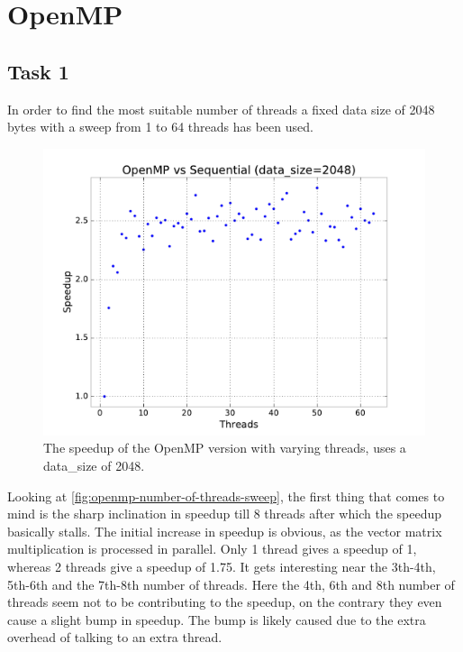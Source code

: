 \documentclass[final]{report}
\begin{document}
\chapter{OpenMP}
\section{Task 1}
In order to find the most suitable number of threads a fixed data size of 2048 bytes with a sweep from 1 to 64 threads has been used.
\begin{figure}[H]
\centering
    \includegraphics[width=\linewidth]{resources/openmp-number-of-threads-sweep.pdf}
    \caption{The speedup of the OpenMP version with varying threads, uses a data\_size of 2048.}
    \label{fig:openmp-number-of-threads-sweep}
\end{figure}
Looking at \autoref{fig:openmp-number-of-threads-sweep}, the first thing that comes to mind is the sharp inclination in speedup till 8 threads after which the speedup basically stalls.
The initial increase in speedup is obvious, as the vector matrix multiplication is processed in parallel.
Only 1 thread gives a speedup of 1, whereas 2 threads give a speedup of 1.75.
It gets interesting near the 3th-4th, 5th-6th and the 7th-8th number of threads.
Here the 4th, 6th and 8th number of threads seem not to be contributing to the speedup, on the contrary they even cause a slight bump in speedup.
The bump is likely caused due to the extra overhead of talking to an extra thread.
\end{document}
